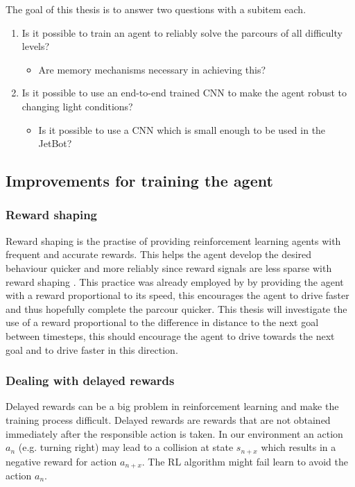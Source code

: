 The goal of this thesis is to answer two questions with a subitem each.
\begin{enumerate}
     \item Is it possible to train an agent to reliably solve the parcours of all difficulty levels?
     \begin{itemize}
          \item Are memory mechanisms necessary in achieving this?
     \end{itemize}
     \item Is it possible to use an end-to-end trained CNN to make the agent robust to changing light conditions?
     \begin{itemize}
          \item Is it possible to use a CNN which is small enough to be used in the JetBot?
     \end{itemize}
  \end{enumerate}

\subsection{Improvements for training the agent}

\subsubsection{Reward shaping}

Reward shaping is the practise of providing reinforcement learning agents with frequent and accurate rewards. This helps the agent develop the desired behaviour quicker and more reliably since reward signals are less sparse with reward shaping \autocite{drl_for_ad}. This practice was already employed by \autocite{maximilian} by providing the agent with a reward proportional to its speed, this encourages the agent to drive faster and thus hopefully complete the parcour quicker. This thesis will investigate the use of a reward proportional to the difference in distance to the next goal between timesteps, this should encourage the agent to drive towards the next goal and to drive faster in this direction.


\subsubsection{Dealing with delayed rewards}
Delayed rewards can be a big problem in reinforcement learning and make the training process difficult. Delayed rewards are rewards that are not obtained immediately after the responsible action is taken. In our environment an action \(a_n\) (e.g. turning right) may lead to a collision at state \(s_{n+x}\) which results in a negative reward for action \(a_{n+x}\). The RL algorithm might fail learn to avoid the action \(a_n\).

